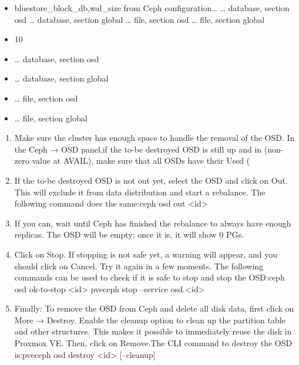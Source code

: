 \begin{itemize}[leftmargin=2cm]

	\item bluestore_block_{db,wal}_size from Ceph configuration… … database, section osd … database, section global … file, section osd … file, section global

	\item 10%

\end{itemize}

\begin{itemize}[leftmargin=2cm]

	\item … database, section osd

	\item … database, section global

	\item … file, section osd

	\item … file, section global

\end{itemize}

\begin{enumerate}[leftmargin=2cm]

	\item Make sure the cluster has enough space to handle the removal of the OSD. In the Ceph → OSD panel,if the to-be destroyed OSD is still up and in (non-zero value at AVAIL), make sure that all OSDs have their Used (%

	\item If the to-be destroyed OSD is not out yet, select the OSD and click on Out. This will exclude it from data distribution and start a rebalance. The following command does the same:ceph osd out <id>

	\item If you can, wait until Ceph has finished the rebalance to always have enough replicas. The OSD will be empty; once it is, it will show 0 PGs.

	\item Click on Stop. If stopping is not safe yet, a warning will appear, and you should click on Cancel. Try it again in a few moments. The following commands can be used to check if it is safe to stop and stop the OSD:ceph osd ok-to-stop <id> pveceph stop --service osd.<id>

	\item Finally: To remove the OSD from Ceph and delete all disk data, first click on More → Destroy. Enable the cleanup option to clean up the partition table and other structures. This makes it possible to immediately reuse the disk in Proxmox VE. Then, click on Remove.The CLI command to destroy the OSD is:pveceph osd destroy <id> [--cleanup]

\end{enumerate}

